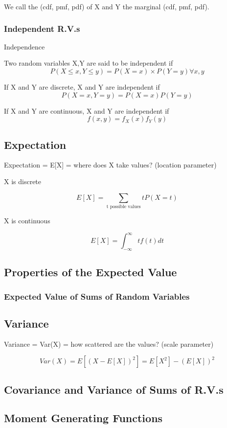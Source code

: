 We call the (cdf, pmf, pdf) of X and Y the marginal (cdf, pmf, pdf).
\subsubsection{Independent R.V.s}
Independence

Two random variables X,Y are said to be independent if 
\[ P(X\leq x, Y\leq y) = P(X=x)\times P(Y=y) \forall x, y \]

If X and Y are discrete, X and Y are independent if 
\[ P(X=x, Y=y) = P(X=x)P(Y=y) \]

If X and Y are continuous, X and Y are independent if 
\[ f(x, y) = f_X(x)f_Y(y) \]
\subsection{Expectation}
Expectation = E[X] = where does X take values?  (location parameter)


X is discrete

\[ E[X] = \sum_{\text{t possible values}} t P(X=t) \]

X is continuous

\[ E[X] = \int_{-\infty}^{\infty} tf(t)dt \]
\subsection{Properties of the Expected Value}
\subsubsection{Expected Value of Sums of Random Variables}
\subsection{Variance}
Variance = Var(X) = how scattered are the values?  (scale parameter)

\[ Var(X) = E[(X-E[X])^2] = E[X^2] - (E[X])^2 \]
\subsection{Covariance and Variance of Sums of R.V.s}
\subsection{Moment Generating Functions}

